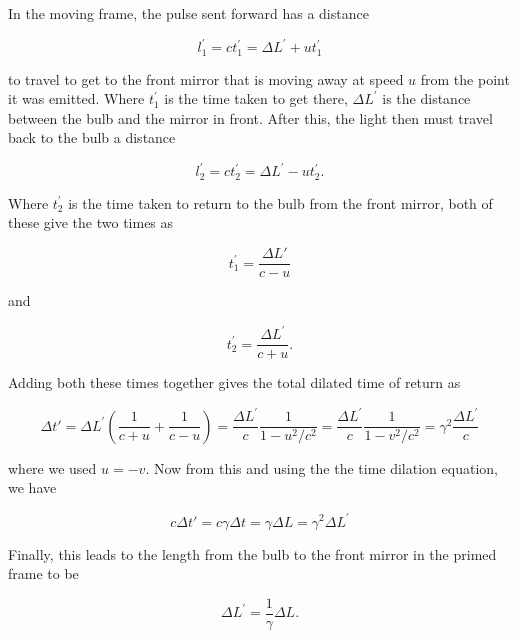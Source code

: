 In the moving frame, the pulse sent forward has a distance

\begin{equation}
	{l^{'}_1} = {c}{t^{'}_1} = {\Delta  L^{'}} + {u} {t^{'}_1}
\end{equation}

to travel to get to the front mirror that is moving away at speed ${u}$ from the point it was emitted.
Where ${t^{'}_1}$ is the time taken to get there, ${\Delta  L^{'}}$ is the distance between the bulb and the mirror in front.
After this, the light then must travel back to the bulb a distance

\begin{equation}
	{l^{'}_2} = {c} {t^{'}_2} = {\Delta  L^{'}} - {u} {t^{'}_2}.
\end{equation}

Where ${t^{'}_2}$ is the time taken to return to the bulb from the front mirror, both of these give the two times as

\begin{equation}
	{t^{'}_1} = \frac{\Delta  L'}{{c} - {u}}
\end{equation}

and

\begin{equation}
	{t^{'}_2} = \frac{{\Delta  L^{'}}}{{c} + {u}}.
\end{equation}

Adding both these times together gives the total dilated time of return as

\begin{equation}
	{\Delta t{'}} = {\Delta  L^{'}}(\frac{1}{{c} + {u}} + \frac{1}{{c} - {u}}) = \frac{\Delta  L^{'}}{c}\frac{1}{1- {u}^2/{c}^2} = \frac{\Delta  L^{'}}{c}\frac{1}{1-{v}^2/{c}^2} = {\gamma}^2 \frac{\Delta  L^{'}}{c}
\end{equation}

where we used ${u}=-{v}$.
Now from this and using the the time dilation equation, we have

\begin{equation}
	{c}{\Delta t{'}} = {c}{\gamma} {\Delta t} = {\gamma} {\Delta L} = {\gamma}^2 {\Delta  L^{'}}
\end{equation}

Finally, this leads to the length from the bulb to the front mirror in the primed frame to be

\begin{equation}
	{\Delta  L^{'}} = \frac{1}{{\gamma}}{\Delta  L}.
\end{equation}

